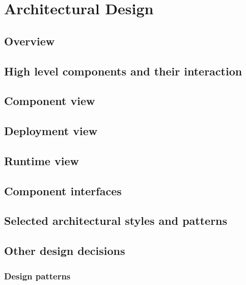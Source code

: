 \section{Architectural Design}
\subsection{Overview}
\subsection{High level components and their interaction}
\subsection{Component view}
\subsection{Deployment view}
\subsection{Runtime view}
\subsection{Component interfaces}
\subsection{Selected architectural styles and patterns}
\subsection{Other design decisions}
	\subsubsection{Design patterns}